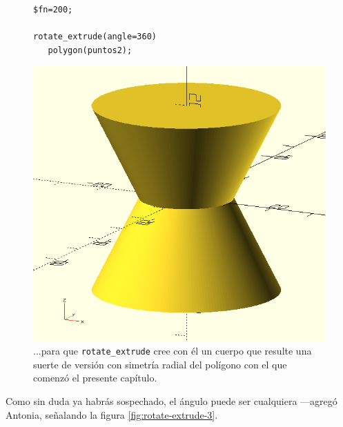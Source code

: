   \begin{figure}[ht]
  \begin{minipage}[]{.5\textwidth}%
\begin{lstlisting}
$fn=200;

rotate_extrude(angle=360)
   polygon(puntos2);
    \end{lstlisting}%
  \end{minipage}\hfill
  \begin{minipage}[]{.5\textwidth}%
      \flushright
      \includegraphics[width=.8\textwidth]{imagenes/rotate-extrude-2}
    \end{minipage}
    \caption{...para que \lstinline!rotate_extrude! cree con él un
      cuerpo que resulte una suerte de versión con simetría radial del
      polígono con el que comenzó el presente capítulo.}
    \label{fig:rotate-extrude-2}
  \end{figure}


  \guillemotright Como sin duda ya habrás sospechado, el ángulo puede
  ser cualquiera ---agregó Antonia, señalando la figura
  \ref{fig:rotate-extrude-3}.

